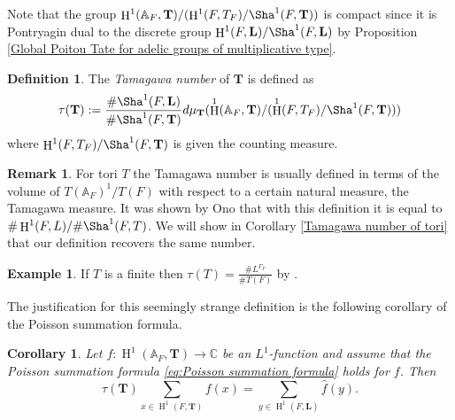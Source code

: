 \documentclass[a4paper,11pt,reqno]{amsart}
\newcommand{\C}{\mathbb{C}}
\newcommand{\A}{\mathbb{A}}
\DeclareMathOperator{\HH}{H}
\newtheorem{corollary}[theorem]{Corollary}
\theoremstyle{definition}
\newtheorem{definition}[theorem]{Definition}
\newtheorem{example}[theorem]{Example}
\newtheorem{remark}[theorem]{Remark}
\begin{document}
Note that the group $\HH^1(\A_F, \mathbf{T})/(\HH^1(F, T_F)/\Sha^1(F, \mathbf{T}))$ is compact since it is Pontryagin dual to the discrete group $\HH^1(F, \mathbf{L})/\Sha^1(F, \mathbf{L})$ by Proposition \ref{Global Poitou Tate for adelic groups of multiplicative type}.
\begin{definition}
	The \emph{Tamagawa number} of $\mathbf{T}$ is defined as 
	\begin{equation*}
		\tau(\mathbf{T}) := \frac{\# \Sha^1(F, \mathbf{L})}{\# \Sha^1(F, \mathbf{T})} d\mu_{\mathbf{T}}(\HH^1(\A_F, \mathbf{T})/(\HH^1(F, T_F)/\Sha^1(F, \mathbf{T})))
	\end{equation*}
	where $\HH^1(F, T_F)/\Sha^1(F, \mathbf{T})$ is given the counting measure.
\end{definition}
\begin{remark}
	For tori $T$ the Tamagawa number is usually defined in terms of the volume of $T(\A_F)^1/T(F)$ with respect to a certain natural measure, the Tamagawa measure. It was shown by Ono \cite{Ono1963Tamagawa} that with this definition it is equal to $\# \HH^1(F, L)/\# \Sha^1(F, T)$. We will show in Corollary \ref{Tamagawa number of tori} that our definition recovers the same number.
\end{remark}
\begin{example}
	If $T$ is a finite then $\tau(T) = \frac{\# L^{\Gamma_F}}{\# T(F)}$ by \cite[Lem.~3.1.5]{Darda2022Torsors}.
\end{example}
The justification for this seemingly strange definition is the following corollary of the Poisson summation formula.
\begin{corollary}\label{cor:Poisson summation for cohomology}
	Let $f: \HH^1(\A_F, \mathbf{T}) \to \C$ be an $L^1$-function and assume that the Poisson summation formula \eqref{eq:Poisson summation formula} holds for $f$. Then
	\begin{equation}\label{eq:Poisson summation for cohomology}
		\tau(\mathbf{T}) \sum_{x \in \HH^1(F, \mathbf{T})} f(x) = \sum_{y \in \HH^1(F, \mathbf{L})} \hat{f}(y).
	\end{equation}
\end{corollary}
\end{document}
